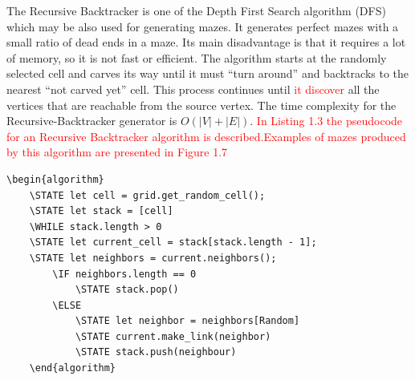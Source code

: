 The Recursive Backtracker is one of the Depth First Search algorithm (DFS) which may be also used for generating mazes. It generates perfect mazes with a small ratio of dead ends in a maze. Its main disadvantage is that it requires a lot of memory, so it is not fast or efficient\cite{Puntambekar}. The algorithm starts at the randomly selected cell and carves its way until it must “turn around” and backtracks to the nearest “not carved yet” cell. This process continues until \textcolor{red}{it discover} all the vertices that are reachable from the source vertex. The time complexity for the Recursive-Backtracker generator is $O(|V|+|E|)$. \textcolor{red}{In Listing 1.3 the pseudocode for an Recursive Backtracker algorithm is described.Examples of mazes produced by this algorithm are presented in Figure 1.7}

\begin{lstlisting}[caption={Pseudocode for a Recursive-Backtracker algorithm}]
	\begin{algorithm}
	\STATE let cell = grid.get_random_cell();
	\STATE let stack = [cell]
	\WHILE stack.length > 0
	\STATE let current_cell = stack[stack.length - 1];
	\STATE let neighbors = current.neighbors();
		\IF neighbors.length == 0
			\STATE stack.pop()
		\ELSE 
			\STATE let neighbor = neighbors[Random]
			\STATE current.make_link(neighbor)
			\STATE stack.push(neighbour)	
	\end{algorithm}
	\end{lstlisting}
\newline
